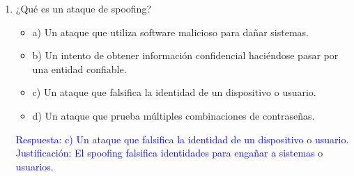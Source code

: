 \documentclass[a4paper]{article}
\begin{document}
\begin{enumerate}
    
    \item ¿Qué es un ataque de spoofing?
    \begin{itemize}
        \item a) Un ataque que utiliza software malicioso para dañar sistemas.
        \item b) Un intento de obtener información confidencial haciéndose pasar por una entidad confiable.
        \item c) Un ataque que falsifica la identidad de un dispositivo o usuario.
        \item d) Un ataque que prueba múltiples combinaciones de contraseñas.
    \end{itemize}
    \textcolor{blue}{Respuesta: c) Un ataque que falsifica la identidad de un dispositivo o usuario. Justificación: El spoofing falsifica identidades para engañar a sistemas o usuarios.}
    \vspace{1cm}
    

\end{enumerate}
\end{document}
